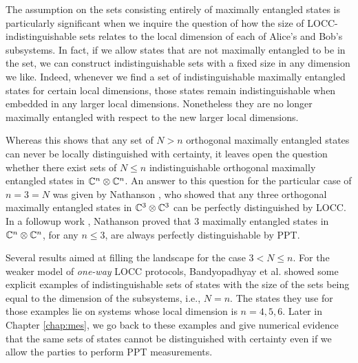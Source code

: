 The assumption on the sets consisting entirely of maximally entangled states is
particularly significant when we inquire the question of how the size of LOCC-indistinguishable 
sets relates to the local dimension of each of Alice's and Bob's subsystems. 
In fact, if we allow states that are not maximally entangled to be in the set,
we can construct indistinguishable sets with a fixed size in any dimension we like.
Indeed, whenever we find a set of indistinguishable maximally entangled states 
for certain local dimensions, those states remain indistinguishable when embedded 
in any larger local dimensions. Nonetheless they are no longer maximally 
entangled with respect to the new larger local dimensions.

Whereas this shows that any set of $N > n$ orthogonal maximally entangled states 
can never be locally distinguished with certainty, it leaves open the question 
whether there exist sets of $N \leq n$ indistinguishable orthogonal maximally 
entangled states in $\mathbb{C}^{n}\otimes\mathbb{C}^{n}$.
An answer to this question for the particular case of $n = 3 = N$ was given by 
Nathanson \cite{Nathanson05}, who showed that any three orthogonal maximally 
entangled states in $\mathbb{C}^{3}\otimes\mathbb{C}^{3}$ can be perfectly 
distinguished by LOCC. In a followup work \cite{Nathanson13}, 
Nathanson proved that $3$ maximally entangled states 
in $\mathbb{C}^{n}\otimes\mathbb{C}^{n}$, for any $n \leq 3$, are always perfectly
distinguishable by PPT.

Several results aimed at filling the landscape for the case $3 < N \leq n$.
For the weaker model of \emph{one-way} LOCC protocols, 
Bandyopadhyay et al. \cite{Bandyopadhyay11a} showed some explicit examples of 
indistinguishable sets of states with the size of the sets being equal to the 
dimension of the subsystems, i.e., $N = n$. The states they use for those 
examples lie on systems whose local dimension is $n = 4, 5, 6$. 
Later in Chapter \ref{chap:mes}, we go back to these examples and give
numerical evidence that the same sets of states cannot be distinguished with 
certainty even if we allow the parties to perform PPT measurements. 

